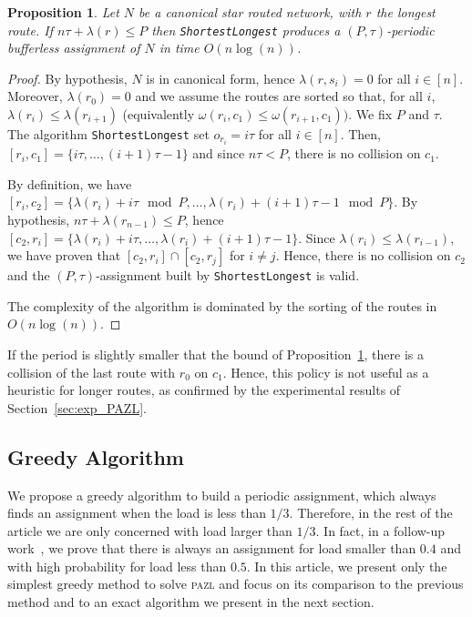 \documentclass[a4paper,10pt]{journal}
\newcommand\shortestlongest{\texttt{ShortestLongest}\xspace}
\newtheorem{proposition}{Proposition}
\newcommand\pazl{\textsc{pazl}\xspace}
\begin{document}
      \begin{proposition} Let $N$ be a canonical star routed network, with $r$ the longest route. If $n\tau + \lambda(r) \leq P$ then \shortestlongest produces a $(P,\tau)$-periodic bufferless assignment of $N$ in time $O(n\log(n))$.\label{prop:SL}
      \end{proposition}
      \begin{proof}
       By hypothesis, $N$ is in canonical form, hence $\lambda(r,s_i) = 0$ for all $i \in [n]$. Moreover, $\lambda(r_0) = 0$ and we assume the routes are sorted so that, for all $i$, $\lambda(r_i) \leq \lambda(r_{i+1})$ (equivalently $\omega(r_i,c_1) \leq \omega(r_{i+1},c_1))$. We fix $P$ and $\tau$. The algorithm \shortestlongest set $o_{r_i} = i\tau$ for all $i \in [n]$. Then, $[r_{i},c_1] = \{i\tau,\dots, (i+1)\tau -1\}$ and since $n\tau < P$, there is no collision on $c_1$. 

       By definition, we have  $[r_{i},c_2] = \{\lambda(r_{i}) + i\tau \mod P, \dots, \lambda(r_{i}) + (i+1)\tau -1 \mod P\}$. By hypothesis, $n\tau + \lambda(r_{n-1}) \leq P$, hence $[c_2,r_{i}] = \{\lambda(r_{i}) + i\tau, \dots, \lambda(r_{i}) + (i+1)\tau -1\}$. Since  $\lambda(r_i) \leq \lambda(r_{i-1})$, we have proven that $[c_2,r_{i}] \cap [c_2,r_{j}]$ for $i \neq j$. Hence, there is no collision on $c_2$ and the $(P,\tau)$-assignment built by \shortestlongest is valid.

 		The complexity of the algorithm is dominated by the sorting of the routes in $O(n\log(n))$. 
      \end{proof}

      If the period is slightly smaller that the bound of Proposition~\ref{prop:SL}, there is a collision of the last route with $r_0$ on $c_1$. Hence, this policy is not useful as a heuristic for longer routes, as confirmed by the experimental results of Section~\ref{sec:exp_PAZL}. 

   
    \subsection{Greedy Algorithm}
    

     We propose a greedy algorithm to build a periodic assignment, which always finds an assignment when the load is less than $1/3$. Therefore, in the rest of the article we are only concerned with load larger than $1/3$. In fact, in a follow-up work~\cite{guiraud2020scheduling}, we prove that there is always an assignment for load smaller than $0.4$ and with high probability for load less than $0.5$. In this article, we present only the simplest greedy method to solve \pazl and focus on its comparison to the previous method and to an exact algorithm we present in the next section.   
\end{document}
